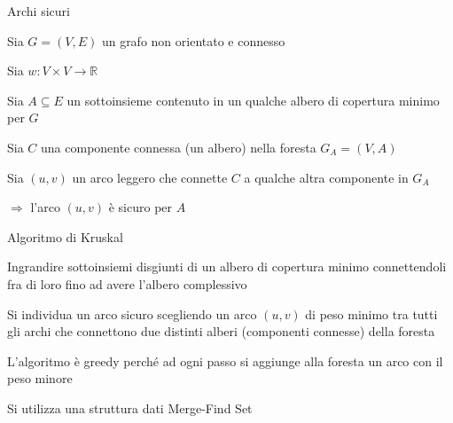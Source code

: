 \begin{frame}{Archi sicuri}

\vspace{-9pt}
\begin{myboxtitle}[Corollario]
\BIL
\item Sia $G=(V,E)$ un grafo non orientato e connesso 
\item Sia $w: V \times V \rightarrow \mathbb{R}$
\item Sia $A \subseteq E$ un sottoinsieme contenuto in un qualche albero di copertura minimo per $G$ 
\item Sia $C$ una componente connessa (un albero) nella foresta $G_A=(V,A)$
\item Sia $(u,v)$ un arco leggero che connette $C$ a qualche altra componente in $G_A$
\EIL

\bigskip
$\Rightarrow$  l'arco $(u,v)$ è sicuro per $A$
\end{myboxtitle}

\end{frame}

\begin{frame}{Algoritmo di Kruskal}

\vspace{-9pt}
\begin{myboxtitle}[Idea]
\BIL
\item Ingrandire sottoinsiemi disgiunti di un albero di copertura minimo
connettendoli fra di loro fino ad avere l’albero complessivo
\item Si individua un arco sicuro scegliendo un arco $(u,v)$ di peso minimo tra
tutti gli archi che connettono due distinti alberi (componenti connesse) della
foresta
\item L’algoritmo è greedy perché ad ogni passo si aggiunge alla foresta un
arco con il peso minore
\EIL
\end{myboxtitle}

\begin{myboxtitle}[Implementazione]
\BIL
\item Si utilizza una struttura dati Merge-Find Set
\EIL
\end{myboxtitle}

\end{frame}

